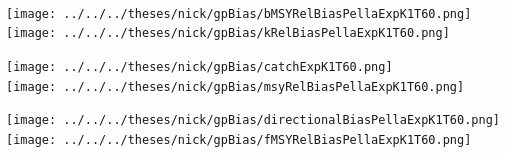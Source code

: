 \documentclass[ xcolor = pdftex, dvipsnames, table ]{beamer}
\begin{document}
{%
\begin{frame}%
$~$
\hspace*{-1.25cm}
\begin{minipage}[h!]{0.33\textwidth}
\hspace*{0.25cm}
\texttt{[image: ../../../theses/nick/gpBias/bMSYRelBiasPellaExpK1T60.png]}\\
\hspace*{0.25cm}
\texttt{[image: ../../../theses/nick/gpBias/kRelBiasPellaExpK1T60.png]}
\end{minipage}
\begin{minipage}[h!]{0.33\textwidth}
\hspace*{0.75cm}
\texttt{[image: ../../../theses/nick/gpBias/catchExpK1T60.png]}\\
\hspace*{0.75cm}
\texttt{[image: ../../../theses/nick/gpBias/msyRelBiasPellaExpK1T60.png]}
\end{minipage}
\begin{minipage}[h!]{0.33\textwidth}
\hspace*{1cm}
\texttt{[image: ../../../theses/nick/gpBias/directionalBiasPellaExpK1T60.png]}\\
\hspace*{1cm}
\texttt{[image: ../../../theses/nick/gpBias/fMSYRelBiasPellaExpK1T60.png]}
\end{minipage}
\end{frame}


}
\end{document}
